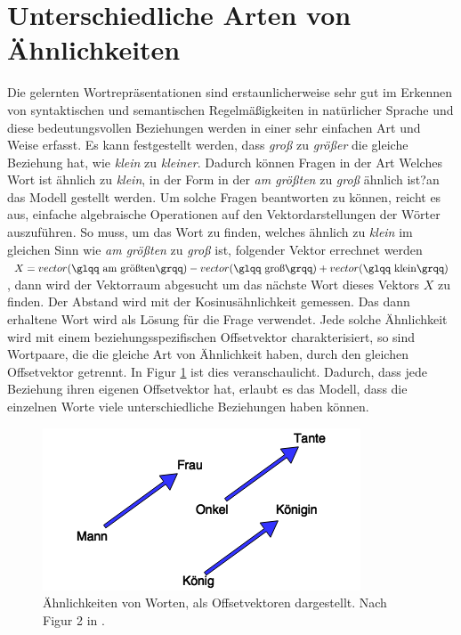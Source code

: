 \documentclass[12pt,a4paper]{report}
\begin{document}
\section*{Unterschiedliche Arten von Ähnlichkeiten}
Die gelernten Wortrepräsentationen sind erstaunlicherweise sehr gut im Erkennen von syntaktischen und semantischen Regelmäßigkeiten in natürlicher Sprache und diese bedeutungsvollen Beziehungen werden in einer sehr einfachen Art und Weise erfasst\cite{DBLP:conf/naacl/MikolovYZ13}. Es kann festgestellt werden, dass \textit{groß} zu \textit{größer} die gleiche Beziehung hat, wie \textit{klein} zu \textit{kleiner}\citep{DBLP:journals/corr/abs-1301-3781}. Dadurch können Fragen in der Art \glqq Welches Wort ist ähnlich zu \textit{klein}, in der Form in der \textit{am größten} zu \textit{groß} ähnlich ist?\grqq an das Modell gestellt werden. Um solche Fragen beantworten zu können, reicht es aus, einfache algebraische Operationen auf den Vektordarstellungen der Wörter auszuführen\citep{DBLP:journals/corr/abs-1301-3781}. So muss, um das Wort zu finden, welches ähnlich zu \textit{klein} im gleichen Sinn wie \textit{am größten} zu \textit{groß} ist, folgender Vektor errechnet werden $X = vector(\textrm{\glqq am größten\grqq}) - vector(\textrm{\glqq groß\grqq}) + vector(\textrm{\glqq klein\grqq})$, dann wird der Vektorraum abgesucht um das nächste Wort dieses Vektors $X$ zu finden\citep{DBLP:journals/corr/abs-1301-3781}. Der Abstand wird mit der Kosinusähnlichkeit gemessen. Das dann erhaltene Wort wird als Lösung für die Frage verwendet. Jede solche Ähnlichkeit wird mit einem beziehungsspezifischen Offsetvektor charakterisiert\citep{DBLP:conf/naacl/MikolovYZ13}, so sind Wortpaare, die die gleiche Art von Ähnlichkeit haben, durch den gleichen Offsetvektor getrennt. In Figur \ref{fig:offsetvectors} ist dies veranschaulicht. Dadurch, dass jede Beziehung ihren eigenen Offsetvektor hat, erlaubt es das Modell, dass die einzelnen Worte viele unterschiedliche Beziehungen haben können.\\



\begin{figure}[h]
  \begin{center}
	\includegraphics[scale=0.65]{OffsetVector2.png}
  \end{center}  
  \caption{Ähnlichkeiten von Worten, als Offsetvektoren dargestellt. Nach Figur 2 in \citep{DBLP:conf/naacl/MikolovYZ13}.}
  \label{fig:offsetvectors}
\end{figure}
\end{document}
